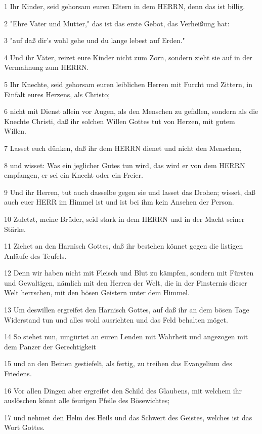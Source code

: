 \par 1 Ihr Kinder, seid gehorsam euren Eltern in dem HERRN, denn das ist billig.
\par 2 "Ehre Vater und Mutter," das ist das erste Gebot, das Verheißung hat:
\par 3 "auf daß dir's wohl gehe und du lange lebest auf Erden."
\par 4 Und ihr Väter, reizet eure Kinder nicht zum Zorn, sondern zieht sie auf in der Vermahnung zum HERRN.
\par 5 Ihr Knechte, seid gehorsam euren leiblichen Herren mit Furcht und Zittern, in Einfalt eures Herzens, als Christo;
\par 6 nicht mit Dienst allein vor Augen, als den Menschen zu gefallen, sondern als die Knechte Christi, daß ihr solchen Willen Gottes tut von Herzen, mit gutem Willen.
\par 7 Lasset euch dünken, daß ihr dem HERRN dienet und nicht den Menschen,
\par 8 und wisset: Was ein jeglicher Gutes tun wird, das wird er von dem HERRN empfangen, er sei ein Knecht oder ein Freier.
\par 9 Und ihr Herren, tut auch dasselbe gegen sie und lasset das Drohen; wisset, daß auch euer HERR im Himmel ist und ist bei ihm kein Ansehen der Person.
\par 10 Zuletzt, meine Brüder, seid stark in dem HERRN und in der Macht seiner Stärke.
\par 11 Ziehet an den Harnisch Gottes, daß ihr bestehen könnet gegen die listigen Anläufe des Teufels.
\par 12 Denn wir haben nicht mit Fleisch und Blut zu kämpfen, sondern mit Fürsten und Gewaltigen, nämlich mit den Herren der Welt, die in der Finsternis dieser Welt herrschen, mit den bösen Geistern unter dem Himmel.
\par 13 Um deswillen ergreifet den Harnisch Gottes, auf daß ihr an dem bösen Tage Widerstand tun und alles wohl ausrichten und das Feld behalten möget.
\par 14 So stehet nun, umgürtet an euren Lenden mit Wahrheit und angezogen mit dem Panzer der Gerechtigkeit
\par 15 und an den Beinen gestiefelt, als fertig, zu treiben das Evangelium des Friedens.
\par 16 Vor allen Dingen aber ergreifet den Schild des Glaubens, mit welchem ihr auslöschen könnt alle feurigen Pfeile des Bösewichtes;
\par 17 und nehmet den Helm des Heils und das Schwert des Geistes, welches ist das Wort Gottes.
